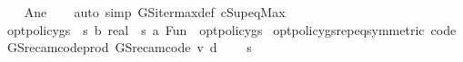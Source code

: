 \begin{isabellebody}
%
\isadelimproof
\ \ %
\endisadelimproof
%
\isatagproof
{}\isamarkupfalse%
\ A{\isacharunderscore}{\kern0pt}ne\isanewline
\ \ \isamarkupfalse%
\ {\isacharparenleft}{\kern0pt}auto\ simp{\isacharcolon}{\kern0pt}\ GS{\isacharunderscore}{\kern0pt}iter{\isacharunderscore}{\kern0pt}max{\isacharunderscore}{\kern0pt}def\ cSup{\isacharunderscore}{\kern0pt}eq{\isacharunderscore}{\kern0pt}Max{\isacharparenright}{\kern0pt}%
\endisatagproof
{\isafoldproof}%
%
\isadelimproof
\isanewline
%
\endisadelimproof
\isanewline
{}\isamarkupfalse%
\ opt{\isacharunderscore}{\kern0pt}policy{\isacharunderscore}{\kern0pt}gs{\isacharprime}{\kern0pt}{\isacharprime}{\kern0pt}\ {\isacharcolon}{\kern0pt}{\isacharcolon}{\kern0pt}\ {\isachardoublequoteopen}{\isacharparenleft}{\kern0pt}{\isacharprime}{\kern0pt}s\ {\isasymRightarrow}\isactrlsub b\ real{\isacharparenright}{\kern0pt}\ {\isasymRightarrow}\ {\isacharparenleft}{\kern0pt}{\isacharprime}{\kern0pt}s{\isacharcomma}{\kern0pt}\ {\isacharprime}{\kern0pt}a{\isacharparenright}{\kern0pt}\ Fun{\isachardoublequoteclose}\ \ opt{\isacharunderscore}{\kern0pt}policy{\isacharunderscore}{\kern0pt}gs%
\isadelimproof
%
\endisadelimproof
%
\isatagproof
\isacommand{{\isachardot}{\kern0pt}}\isamarkupfalse%
%
\endisatagproof
{\isafoldproof}%
%
\isadelimproof
%
\endisadelimproof
\isanewline
\isanewline
{}\isamarkupfalse%
\ opt{\isacharunderscore}{\kern0pt}policy{\isacharunderscore}{\kern0pt}gs{\isacharprime}{\kern0pt}{\isacharprime}{\kern0pt}{\isachardot}{\kern0pt}rep{\isacharunderscore}{\kern0pt}eq{\isacharbrackleft}{\kern0pt}symmetric{\isacharcomma}{\kern0pt}\ code{\isacharbrackright}{\kern0pt}\isanewline
\isanewline
{}\isamarkupfalse%
\ GS{\isacharunderscore}{\kern0pt}rec{\isacharunderscore}{\kern0pt}am{\isacharunderscore}{\kern0pt}code{\isacharprime}{\kern0pt}{\isacharunderscore}{\kern0pt}prod{\isacharcolon}{\kern0pt}\ {\isachardoublequoteopen}GS{\isacharunderscore}{\kern0pt}rec{\isacharunderscore}{\kern0pt}am{\isacharunderscore}{\kern0pt}code{\isacharprime}{\kern0pt}\ v\ d\ {\isacharequal}{\kern0pt}\ \isanewline
\ \ {\isacharparenleft}{\kern0pt}{\isasymlambda}s{\isacharprime}{\kern0pt}{\isachardot}{\kern0pt}\ {\isacharparenleft}{\kern0pt}\isanewline

\end{isabellebody}
